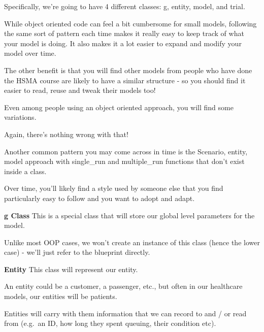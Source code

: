 \documentclass[
  letterpaper,
  DIV=11,
  numbers=noendperiod]{scrreprt}
\begin{document}
Specifically, we're going to have 4 different classes: g, entity, model,
and trial.

While object oriented code can feel a bit cumbersome for small models,
following the same sort of pattern each time makes it really easy to
keep track of what your model is doing. It also makes it a lot easier to
expand and modify your model over time.

The other benefit is that you will find other models from people who
have done the HSMA course are likely to have a similar structure - so
you should find it easier to read, reuse and tweak their models too!

\begin{tcolorbox}[enhanced jigsaw, rightrule=.15mm, colback=white, colframe=quarto-callout-note-color-frame, colbacktitle=quarto-callout-note-color!10!white, toprule=.15mm, coltitle=black, opacityback=0, titlerule=0mm, bottomtitle=1mm, breakable, title=\textcolor{quarto-callout-note-color}{\faInfo}\hspace{0.5em}{Note}, opacitybacktitle=0.6, toptitle=1mm, arc=.35mm, bottomrule=.15mm, leftrule=.75mm, left=2mm]

Even among people using an object oriented approach, you will find some
variations.

Again, there's nothing wrong with that!

Another common pattern you may come across in time is the Scenario,
entity, model approach with single\_run and multiple\_run functions that
don't exist inside a class.

Over time, you'll likely find a style used by someone else that you find
particularly easy to follow and you want to adopt and adapt.

\end{tcolorbox}

\textbf{g Class} This is a special class that will store our global
level parameters for the model.

Unlike most OOP cases, we won't create an instance of this class (hence
the lower case) - we'll just refer to the blueprint directly.

\textbf{Entity} This class will represent our entity.

An entity could be a customer, a passenger, etc., but often in our
healthcare models, our entities will be patients.

Entities will carry with them information that we can record to and / or
read from (e.g.~an ID, how long they spent queuing, their condition
etc).
\end{document}
